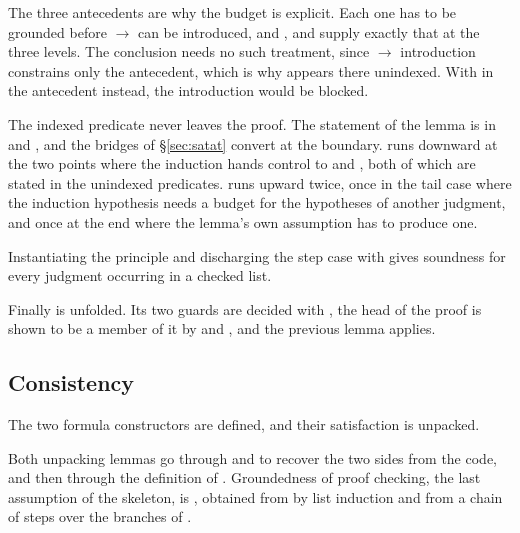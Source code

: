 The three antecedents are why the budget is explicit.  Each one has to be
grounded before $\longrightarrow$ can be introduced, and ,
 and  supply exactly that at the three
levels.  The conclusion needs no such treatment, since $\longrightarrow$ introduction
constrains only the antecedent, which is why  appears there
unindexed.  With  in the antecedent instead, the introduction
would be blocked.

The indexed predicate never leaves the proof.  The statement of the lemma is in
 and , and the bridges of \S\ref{sec:satat}
convert at the boundary.   runs downward at the two points
where the induction hands control to  and , both of which are
stated in the unindexed predicates.   runs upward twice,
once in the tail case where the induction hypothesis needs a budget for the
hypotheses of another judgment, and once at the end where the lemma's own
assumption has to produce one.

Instantiating the principle and discharging the step case with
 gives soundness for every judgment occurring in a
checked list.


\noindent
Finally  is unfolded.  Its two guards are decided with
, the head of the proof is shown to be a member of it by
 and , and the previous lemma applies.


\subsection{Consistency}
\label{sec:consistency}

The two formula constructors are defined, and their satisfaction is unpacked.


\noindent
Both unpacking lemmas go through  and  to
recover the two sides from the code, and then through the definition of
.  Groundedness of proof checking, the last assumption of the
skeleton, is , obtained from  by
list induction and from a chain of  steps over the branches of
.

